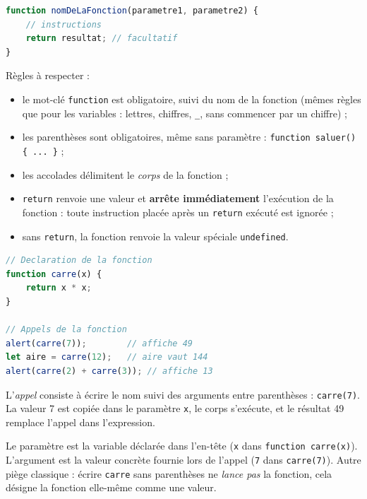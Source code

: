 \documentclass[11pt]{article}
\newcommand{\cle}[1]{{\popxbold\color{popdark}#1}}
\begin{document}
\begin{propriete}
\begin{lstlisting}[language=JavaScript]
function nomDeLaFonction(parametre1, parametre2) {
    // instructions
    return resultat; // facultatif
}
\end{lstlisting}
Règles à respecter :
\begin{itemize}
\item le mot-clé \texttt{function} est obligatoire, suivi du nom de la fonction (mêmes règles que pour les variables : lettres, chiffres, \texttt{\_}, sans commencer par un chiffre) ;
\item les parenthèses sont obligatoires, même sans paramètre : \texttt{function saluer() \{ ... \}} ;
\item les accolades délimitent le \emph{corps} de la fonction ;
\item \texttt{return} renvoie une valeur et \textbf{arrête immédiatement} l'exécution de la fonction : toute instruction placée après un \texttt{return} exécuté est ignorée ;
\item sans \texttt{return}, la fonction renvoie la valeur spéciale \texttt{undefined}.
\end{itemize}
\end{propriete}

\begin{exemplebox}
\begin{lstlisting}[language=JavaScript]
// Declaration de la fonction
function carre(x) {
    return x * x;
}

// Appels de la fonction
alert(carre(7));        // affiche 49
let aire = carre(12);   // aire vaut 144
alert(carre(2) + carre(3)); // affiche 13
\end{lstlisting}
L'\emph{appel} consiste à écrire le nom suivi des \cle{arguments} entre parenthèses : \texttt{carre(7)}. La valeur 7 est copiée dans le paramètre \texttt{x}, le corps s'exécute, et le résultat 49 remplace l'appel dans l'expression.
\end{exemplebox}

\begin{attention}
Le \cle{paramètre} est la variable déclarée dans l'en-tête (\texttt{x} dans \texttt{function carre(x)}). L'\cle{argument} est la valeur concrète fournie lors de l'appel (\texttt{7} dans \texttt{carre(7)}). Autre piège classique : écrire \texttt{carre} sans parenthèses ne \emph{lance pas} la fonction, cela désigne la fonction elle-même comme une valeur.
\end{attention}
\end{document}
